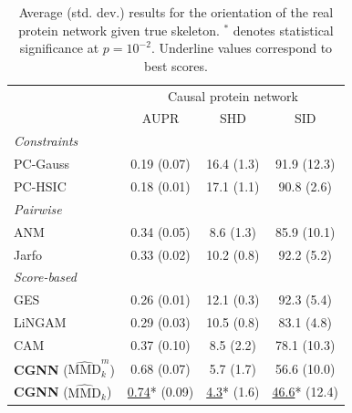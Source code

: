 \documentclass[a4paper, 11pt]{article}
\begin{document}
\begin{table}[ht!]
  \caption{Average (std. dev.) results for the orientation of the real protein network given true skeleton. $^*$ denotes statistical significance at $p=10^{-2}$. Underline values correspond to best scores.}
  \footnotesize
  \hspace*{-1.5cm}
    \centering
  \begin{tabular}{l|ccc|}
    \toprule
     &  \multicolumn{3}{c}{Causal protein network}\\
     & AUPR & SHD & SID \\
    \midrule
    \textit{Constraints}\\
    PC-Gauss & 0.19 (0.07) & 16.4 (1.3) & 91.9 (12.3) \\
  
    PC-HSIC & 0.18 (0.01) & 17.1 (1.1) & 90.8 (2.6) \\
    \midrule
    \textit{Pairwise}\\
    ANM & 0.34 (0.05) & 8.6 (1.3) & 85.9 (10.1)\\
    Jarfo & 0.33 (0.02) & 10.2 (0.8) & 92.2 (5.2)\\
    \midrule
    \textit{Score-based}\\
        GES & 0.26 (0.01) & 12.1 (0.3) & 92.3 (5.4)\\ 
     LiNGAM & 0.29 (0.03) & 10.5 (0.8) & 83.1 (4.8) \\
     CAM & 0.37 (0.10) & 8.5 (2.2) & 78.1 (10.3)\\    
    \textbf{CGNN} ($\widehat{\text{MMD}}^m_k$) & 0.68 (0.07) & 5.7 (1.7) & 56.6 (10.0) \\
    \textbf{CGNN} ($\widehat{\text{MMD}}_k$) & \underline{0.74}* (0.09)  & \underline{4.3}* (1.6) & \underline{46.6}* (12.4)\\
    \bottomrule
  \end{tabular}
   \hspace*{-2cm}
  \label{table:cyto_network}
\end{table}
\end{document}
